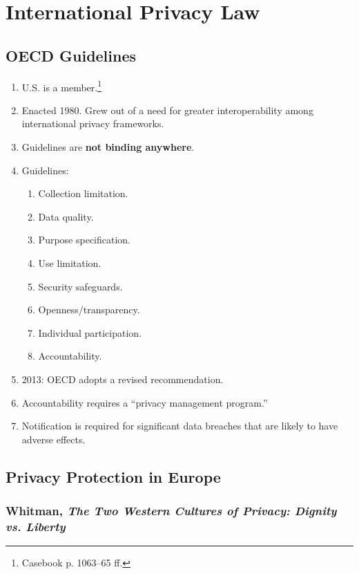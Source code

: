\section{International Privacy Law}

\subsection{OECD Guidelines}

\begin{enumerate}
    \item U.S. is a member.\footnote{Casebook p. 1063--65 ff.}
    \item Enacted 1980. Grew out of a need for greater interoperability among 
    international privacy frameworks.
    \item Guidelines are \textbf{not binding anywhere}.
    \item Guidelines:
    \begin{enumerate}
        \item Collection limitation.
        \item Data quality.
        \item Purpose specification.
        \item Use limitation.
        \item Security safeguards.
        \item Openness/transparency.
        \item Individual participation.
        \item Accountability.
    \end{enumerate}
    \item 2013: OECD adopts a revised recommendation.
    \item Accountability requires a ``privacy management program.''
    \item Notification is required for significant data breaches that are 
    likely to have adverse effects.
\end{enumerate}

\subsection{Privacy Protection in Europe}

\subsubsection{Whitman, \emph{The Two Western Cultures of Privacy: Dignity vs. 
Liberty}}

